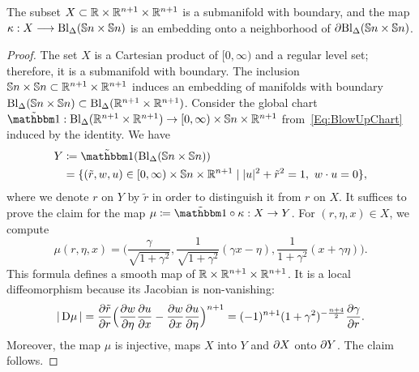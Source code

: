 \documentclass[\MainFolder/Text.tex]{subfiles}
\begin{document}
\begin{Lem} \label{Lem:NewBlowupParam}
The subset $X\subset \mathbb{R}\times \mathbb{R}^{n+1}\times\mathbb{R}^{n+1}$ is a submanifold with boundary, and the map $\kappa: X \longrightarrow \mathrm{Bl}_\Delta(\mathbb{S}{n}\times \mathbb{S}{n})$ is an embedding onto a neighborhood of $\partial \mathrm{Bl}_\Delta(\mathbb{S}{n}\times \mathbb{S}{n})$.
\end{Lem}
%
\begin{proof}
The set $X$ is a Cartesian product of $[0,\infty)$ and a regular level set; therefore, it is a submanifold with boundary. The inclusion $\mathbb{S}{n}\times \mathbb{S}{n} \subset \mathbb{R}^{n+1}\times \mathbb{R}^{n+1}$ induces an embedding of manifolds with boundary $\mathrm{Bl}_\Delta(\mathbb{S}{n}\times\mathbb{S}{n})\subset \mathrm{Bl}_\Delta(\mathbb{R}^{n+1}\times \mathbb{R}^{n+1})$.  Consider the global chart $\tilde{\Id}: \Bl_\Diag(\R^{n+1}\times \R^{n+1}) \rightarrow [0,\infty) \times \Sph{n} \times \R^{n+1}$ from~\eqref{Eq:BlowUpChart} induced by the identity. We have
$$ \begin{aligned}Y &\coloneqq \tilde{\Id}(\Bl_\Diag(\Sph{n}\times \Sph{n})) \\ &= \{(\tilde{r},w,u)\in [0,\infty) \times \Sph{n} \times \R^{n+1} \mid \Abs{u}^2+\tilde{r}^2=1,\ w\cdot u = 0\}, \end{aligned}$$ 
where we denote $r$ on $Y$ by $\tilde{r}$ in order to distinguish it from $r$ on $X$. It suffices to prove the claim for the map $\mu\coloneqq \tilde{\Id}\circ\kappa: X \rightarrow Y$. For $(r,\eta,x)\in X$, we compute
$$ \mu(r,\eta,x) = \biggl( \frac{\gamma}{\sqrt{1+\gamma^2}}, \frac{1}{\sqrt{1+\gamma^2}}(\gamma x - \eta), \frac{1}{1+\gamma^2}(x+\gamma \eta) \biggr). $$
This formula defines a smooth map of $\mathbb{R}\times \mathbb{R}^{n+1}\times\mathbb{R}^{n+1}$.
It is a local diffeomorphism because its Jacobian is non-vanishing:
$$ |\Jac{\mu}| = \frac{\partial \tilde{r}}{\partial r} \Bigl(\frac{\partial w}{\partial \eta}\frac{\partial u}{\partial x}  - \frac{\partial w}{\partial x}\frac{\partial u}{\partial \eta}\Bigr)^{n+1} = (-1)^{n+1}(1+\gamma^2)^{-\frac{n+4}{2}} \frac{\partial \gamma}{\partial r}. $$
Moreover, the map $\mu$ is injective, maps $X$ into $Y$ and $\partial X$ onto $\partial Y$. The claim follows.
\end{proof}
\end{document}
